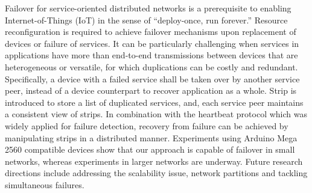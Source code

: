 \begin{abstractEN}

\noindent Failover for service-oriented distributed networks is a prerequisite
to enabling Internet-of-Things (IoT) in the sense of “deploy-once, run forever.”
Resource reconfiguration is required to achieve failover mechanisms upon
replacement of devices or failure of services. It can be particularly
challenging when services in applications have more than end-to-end
transmissions between devices that are heterogeneous or versatile, for which
duplications can be costly and redundant. Specifically, a device with a failed
service shall be taken over by another service peer, instead of a device
counterpart to recover application as a whole. Strip is introduced to store
a list of duplicated services, and, each service peer maintains a consistent
view of strips. In combination with the heartbeat protocol which was widely
applied for failure detection, recovery from failure can be achieved by
manipulating strips in a distributed manner. Experiments using Arduino Mega 2560
compatible devices show that our approach is capable of failover in small
networks, whereas experiments in larger networks are underway. Future research
directions include addressing the scalability issue, network partitions and
tackling simultaneous failures.

\end{abstractEN}

\begin{comment}


\terms{System, Policy}

\keywords{Service-Oriented WSN, Fault Tolerance}

\end{comment}
